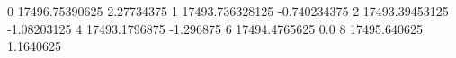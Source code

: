 0 17496.75390625 2.27734375
1 17493.736328125 -0.740234375
2 17493.39453125 -1.08203125
4 17493.1796875 -1.296875
6 17494.4765625 0.0
8 17495.640625 1.1640625
